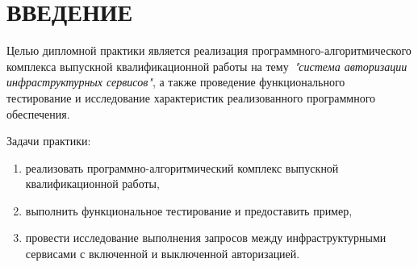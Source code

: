 {\centering \chapter*{ВВЕДЕНИЕ}}

Целью дипломной практики является реализация программного-алгоритмического комплекса выпускной квалификационной работы на тему~\textit{"система авторизации инфраструктурных сервисов"}, а также проведение функционального тестирование и исследование характеристик реализованного программного обеспечения.

Задачи практики:
\begin{enumerate}
\item реализовать программно-алгоритмический комплекс выпускной квалификационной работы,
\item выполнить функциональное тестирование и предоставить пример,
\item провести исследование выполнения запросов между инфраструктурными сервисами с включенной и выключенной авторизацией.
\end{enumerate}